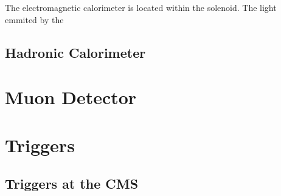 The electromagnetic calorimeter is located within the solenoid. The light emmited by the 


\subsection{Hadronic Calorimeter}

\section{Muon Detector}

\section{Triggers}


\subsection{Triggers at the CMS}




